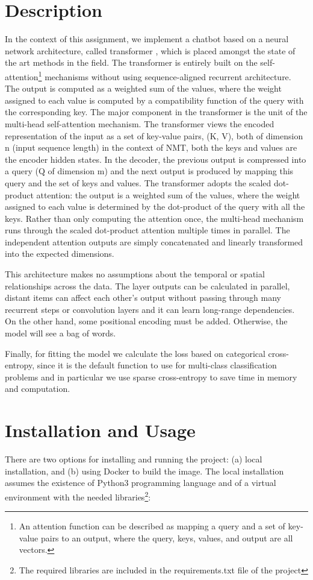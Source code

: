 \documentclass[10pt, twocolumn, a4paper]{article}
\begin{document}
\section{Description}
In the context of this assignment, we implement a chatbot based on a neural network architecture, called transformer \cite{Transformer}, which is placed amongst the state of the art methods in the field. The transformer is entirely built on the self-attention\footnote{An attention function can be described as mapping a query and a set of key-value pairs to an output, where the query, keys, values, and output are all vectors.} mechanisms without using sequence-aligned recurrent architecture. The output is computed as a weighted sum of the values, where the weight assigned to each value is computed by a compatibility function of the query with the corresponding key. The major component in the transformer is the unit of the multi-head self-attention mechanism. The transformer views the encoded representation of the input as a set of key-value pairs, (K, V), both of dimension n (input sequence length) in the context of NMT, both the keys and values are the encoder hidden states. In the decoder, the previous output is compressed into a query (Q of dimension m) and the next output is produced by mapping this query and the set of keys and values. The transformer adopts the scaled dot-product attention: the output is a weighted sum of the values, where the weight assigned to each value is determined by the dot-product of the query with all the keys. Rather than only computing the attention once, the multi-head mechanism runs through the scaled dot-product attention multiple times in parallel. The independent attention outputs are simply concatenated and linearly transformed into the expected dimensions.

This architecture makes no assumptions about the temporal or spatial relationships across the data. The layer outputs can be calculated in parallel, distant items can affect each other’s output without passing through many recurrent steps or convolution layers and it can learn long-range dependencies. On the other hand, some positional encoding must be added. Otherwise, the model will see a bag of words. 

Finally, for fitting the model we calculate the loss based on categorical cross-entropy, since it is the default function to use for multi-class classification problems and in particular we use sparse cross-entropy to save time in memory and computation.

\section{Installation and Usage}
There are two options for installing and running the project: (a) local installation, and (b) using Docker to build the image. The local installation assumes the existence of Python3 programming language and of a virtual environment with the needed libraries\footnote{The required libraries are included in the requirements.txt file of the project}:
\end{document}
